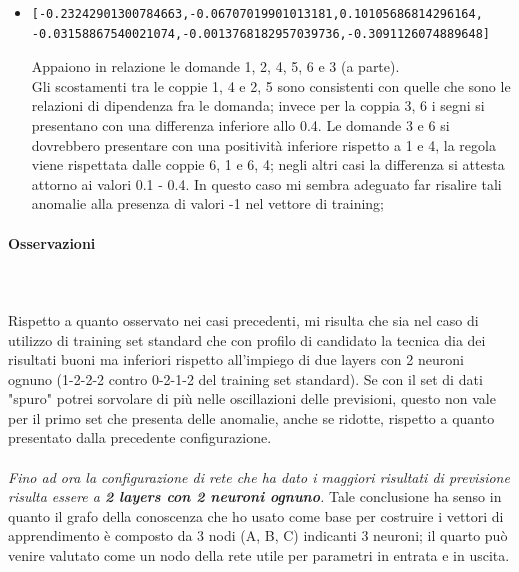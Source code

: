 \begin{itemize}
\item \begin{verbatim}[-0.23242901300784663,-0.06707019901013181,0.10105686814296164,
-0.03158867540021074,-0.0013768182957039736,-0.3091126074889648]
\end{verbatim}
Appaiono in relazione le domande 1, 2, 4, 5, 6 e 3 (a parte).\\
Gli scostamenti tra le coppie 1, 4 e 2, 5 sono consistenti con quelle che sono le relazioni di dipendenza fra le domanda; invece per la coppia 3, 6 i segni si presentano con una differenza inferiore allo 0.4.
Le domande 3 e 6 si dovrebbero presentare con una positivit\`a inferiore rispetto a 1 e 4, la regola  viene rispettata  dalle coppie 6, 1 e  6, 4; negli altri casi la differenza si attesta attorno ai valori 0.1 - 0.4. In questo caso  mi sembra adeguato far risalire tali anomalie alla presenza di valori -1 nel vettore di training;
\end{itemize}

\paragraph{Osservazioni}\mbox{}
\label{Osservazioni su rete a 4 neuroni per 1 layer}
\\\\
\noindent
Rispetto a quanto osservato nei casi precedenti, mi risulta che sia nel caso di utilizzo di training set standard che con profilo di candidato la tecnica dia dei risultati buoni ma inferiori rispetto all'impiego di due layers con 2 neuroni ognuno (1-2-2-2 contro 0-2-1-2 del training set standard). Se con il set di dati "spuro" potrei sorvolare di pi\`u nelle oscillazioni delle previsioni, questo non vale per il primo set che presenta delle anomalie, anche se ridotte, rispetto a quanto presentato dalla precedente configurazione.
\\\\
\noindent
\textit{Fino ad ora la configurazione di rete che ha dato i maggiori risultati di previsione risulta essere a \textbf{2 layers con 2 neuroni ognuno}.}
Tale conclusione ha senso in quanto il grafo della conoscenza che ho usato come base per costruire i vettori di apprendimento \`e composto da 3 nodi (A, B, C) indicanti 3 neuroni; il quarto pu\`o venire valutato come un nodo della rete utile per parametri in entrata e in uscita.


